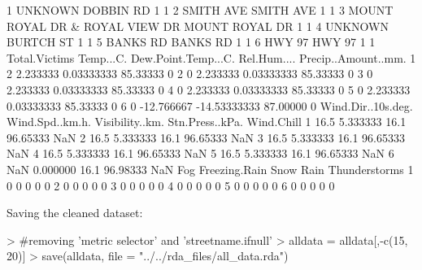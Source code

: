 \documentclass[11pt, a4paper]{article}
\begin{document}
\begin{Schunk}
\begin{Soutput}
1                        UNKNOWN        DOBBIN RD               1             1
2                      SMITH AVE        SMITH AVE               1             1
3 MOUNT ROYAL DR & ROYAL VIEW DR   MOUNT ROYAL DR               1             1
4                        UNKNOWN        BURTCH ST               1             1
5                       BANKS RD         BANKS RD               1             1
6                         HWY 97           HWY 97               1             1
  Total.Victims  Temp...C. Dew.Point.Temp...C. Rel.Hum.... Precip..Amount..mm.
1             2   2.233333          0.03333333    85.33333                   0
2             0   2.233333          0.03333333    85.33333                   0
3             0   2.233333          0.03333333    85.33333                   0
4             0   2.233333          0.03333333    85.33333                   0
5             0   2.233333          0.03333333    85.33333                   0
6             0 -12.766667        -14.53333333    87.00000                   0
  Wind.Dir..10s.deg. Wind.Spd..km.h. Visibility..km. Stn.Press..kPa. Wind.Chill
1               16.5        5.333333            16.1        96.65333        NaN
2               16.5        5.333333            16.1        96.65333        NaN
3               16.5        5.333333            16.1        96.65333        NaN
4               16.5        5.333333            16.1        96.65333        NaN
5               16.5        5.333333            16.1        96.65333        NaN
6                NaN        0.000000            16.1        96.98333        NaN
  Fog Freezing.Rain Snow Rain Thunderstorms
1   0             0    0    0             0
2   0             0    0    0             0
3   0             0    0    0             0
4   0             0    0    0             0
5   0             0    0    0             0
6   0             0    0    0             0
\end{Soutput}
\end{Schunk}




Saving the cleaned dataset:

\begin{Schunk}
\begin{Sinput}
> #removing 'metric selector' and 'streetname.ifnull'
> alldata = alldata[,-c(15, 20)]
> save(alldata, file = "../../rda_files/all_data.rda")
\end{Sinput}
\end{Schunk}
\end{document}

